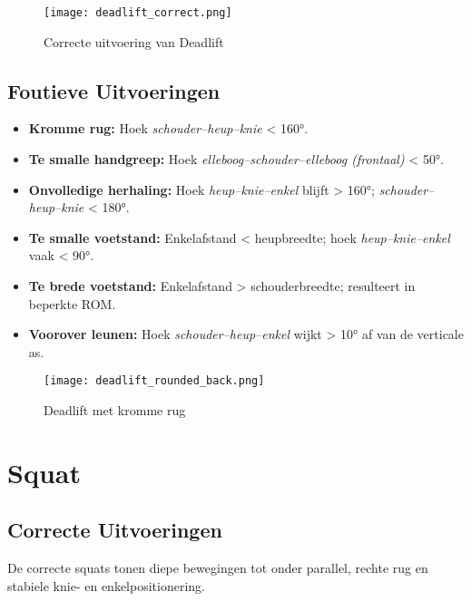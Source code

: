 \begin{figure}[h]
    \centering
    \texttt{[image: deadlift\_correct.png]}
    \caption{Correcte uitvoering van Deadlift}
    \label{fig:deadlift_correct}
\end{figure}

\subsection{Foutieve Uitvoeringen}
\begin{itemize}
    \item \textbf{Kromme rug:} Hoek \textit{schouder–heup–knie} < 160°.
    
    \item \textbf{Te smalle handgreep:} Hoek \textit{elleboog–schouder–elleboog (frontaal)} < 50°.
    
    \item \textbf{Onvolledige herhaling:} Hoek \textit{heup–knie–enkel} blijft > 160°; \textit{schouder–heup–knie} < 180°.
    
    \item \textbf{Te smalle voetstand:} Enkelafstand < heupbreedte; hoek \textit{heup–knie–enkel} vaak < 90°.
    
    \item \textbf{Te brede voetstand:} Enkelafstand > schouderbreedte; resulteert in beperkte ROM.
    
    \item \textbf{Voorover leunen:} Hoek \textit{schouder–heup–enkel} wijkt > 10° af van de verticale as.
\end{itemize}

\begin{figure}[h]
    \centering
    \texttt{[image: deadlift\_rounded\_back.png]}
    \caption{Deadlift met kromme rug}
    \label{fig:deadlift_rounded_back}
\end{figure}

\section{Squat}

\subsection{Correcte Uitvoeringen}
De correcte squats tonen diepe bewegingen tot onder parallel, rechte rug en stabiele knie- en enkelpositionering.

